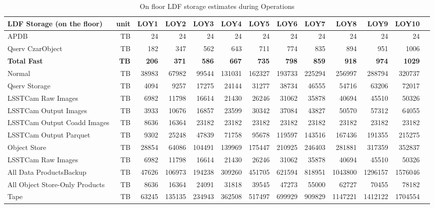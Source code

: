 \tiny \begin{longtable} { |p{}  |r  |r  |r  |r  |r  |r  |r  |r  |r  |r  |r  |r |} 
\caption{On floor LDF storage estimates during Operations
 \label{tab:storageFloorOps}}\\ 
\hline 
\textbf{LDF Storage (on the floor)}&\textbf{unit}&\textbf{LOY1}&\textbf{LOY2}&\textbf{LOY3}&\textbf{LOY4}&\textbf{LOY5}&\textbf{LOY6}&\textbf{LOY7}&\textbf{LOY8}&\textbf{LOY9}&\textbf{LOY10} \\ \hline
{APDB}&{TB}&{24}&{24}&{24}&{24}&{24}&{24}&{24}&{24}&{24}&{24} \\ \hline
{Qserv Czar\/Object}&{TB}&{182}&{347}&{562}&{643}&{711}&{774}&{835}&{894}&{951}&{1006} \\ \hline
\textbf{Total Fast}&\textbf{TB}&\textbf{206}&\textbf{371}&\textbf{586}&\textbf{667}&\textbf{735}&\textbf{798}&\textbf{859}&\textbf{918}&\textbf{974}&\textbf{1029} \\ \hline
{Normal}&{TB}&{38983}&{67982}&{99544}&{131031}&{162327}&{193733}&{225294}&{256997}&{288794}&{320737} \\ \hline
{Qserv Storage}&{TB}&{4094}&{9257}&{17275}&{24144}&{31277}&{38734}&{46555}&{54716}&{63206}&{72017} \\ \hline
{LSSTCam Raw Images}&{TB}&{6982}&{11798}&{16614}&{21430}&{26246}&{31062}&{35878}&{40694}&{45510}&{50326} \\ \hline
{LSSTCam Output Images}&{TB}&{3933}&{10676}&{16857}&{23599}&{30342}&{37084}&{43827}&{50570}&{57312}&{64055} \\ \hline
{LSSTCam Output Coadd Images}&{TB}&{8636}&{16364}&{23182}&{23182}&{23182}&{23182}&{23182}&{23182}&{23182}&{23182} \\ \hline
{LSSTCam Output Parquet}&{TB}&{9302}&{25248}&{47839}&{71758}&{95678}&{119597}&{143516}&{167436}&{191355}&{215275} \\ \hline
{Object Store}&{TB}&{28854}&{64086}&{104491}&{139969}&{175447}&{210925}&{246403}&{281881}&{317359}&{352837} \\ \hline
{LSSTCam Raw Images}&{TB}&{6982}&{11798}&{16614}&{21430}&{26246}&{31062}&{35878}&{40694}&{45510}&{50326} \\ \hline
{All Data Products\/Backup}&{TB}&{47626}&{106973}&{194238}&{309260}&{451705}&{621594}&{818951}&{1043800}&{1296157}&{1576046} \\ \hline
{All Object Store-Only Products}&{TB}&{8636}&{16364}&{24091}&{31818}&{39545}&{47273}&{55000}&{62727}&{70455}&{78182} \\ \hline
{Tape}&{TB}&{63245}&{135135}&{234943}&{362508}&{517497}&{699929}&{909829}&{1147221}&{1412122}&{1704554} \\ \hline
\end{longtable} \normalsize

